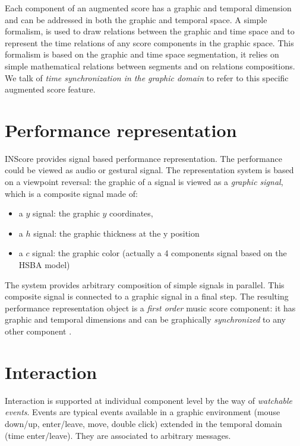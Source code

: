 \documentclass{nime-workshop}
\begin{document}
Each component of an augmented score has a graphic and temporal dimension and can be addressed in both the graphic and temporal space. A simple formalism, is used to draw relations between the graphic and time space and to represent the time relations of any score components in the graphic space. This formalism is based on the graphic and time space segmentation, it relies on simple mathematical relations between segments and on relations compositions. We talk of \emph{time synchronization in the graphic domain}\cite{fober:10b} to refer to this specific augmented score feature.


\section{Performance representation}\label{sec:perf}
INScore provides signal based performance representation. The performance could be viewed as audio or gestural signal. The representation system is based on a viewpoint reversal: the graphic of a signal is viewed as a \emph{graphic signal}, which is a composite signal made of:
\begin{itemize}
\item a $y$ signal: the graphic $y$ coordinates,
\item a $h$ signal: the graphic thickness at the y position
\item a $c$ signal: the graphic color (actually a 4 components signal based on the HSBA model)
\end{itemize}

The system provides arbitrary composition of simple signals in parallel. This composite signal is connected to a graphic signal in a final step. The resulting performance representation object is a \emph{first order} music score component: it has graphic and temporal dimensions and can be graphically \emph{synchronized} to any other component \cite{Fober:10c}.


\section{Interaction}
Interaction is supported at individual component level by the way of \emph{watchable events}. Events are typical events available in a graphic environment (mouse down/up, enter/leave, move, double click) extended in the temporal domain (time enter/leave). They are associated to arbitrary messages. 
\end{document}
